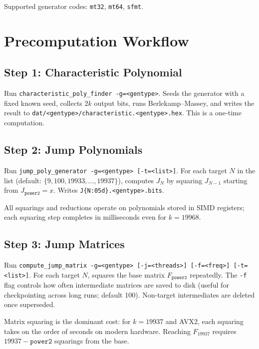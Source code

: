 \documentclass{article}
\begin{document}
Supported generator codes: \texttt{mt32}, \texttt{mt64}, \texttt{sfmt}.

\section{Precomputation Workflow}
\label{sec:workflow}

\subsection{Step 1: Characteristic Polynomial}

Run \texttt{characteristic\_poly\_finder -g=<gentype>}.  Seeds the generator with a fixed
known seed, collects $2k$ output bits, runs Berlekamp--Massey, and writes the result to
\texttt{dat/<gentype>/characteristic.<gentype>.hex}.  This is a one-time computation.

\subsection{Step 2: Jump Polynomials}

Run \texttt{jump\_poly\_generator -g=<gentype> [-t=<list>]}.  For each target $N$ in the
list (default: $\{9, 100, 19933, \ldots, 19937\}$), computes $J_N$ by squaring $J_{N-1}$
starting from $J_{\mathtt{power2}} = x$.  Writes \texttt{J\{N:05d\}.<gentype>.bits}.

All squarings and reductions operate on polynomials stored in SIMD registers; each
squaring step completes in milliseconds even for $k = 19968$.

\subsection{Step 3: Jump Matrices}

Run \texttt{compute\_jump\_matrix -g=<gentype> [-j=<threads>] [-f=<freq>] [-t=<list>]}.
For each target $N$, squares the base matrix $F_{\mathtt{power2}}$ repeatedly.  The
\texttt{-f} flag controls how often intermediate matrices are saved to disk (useful for
checkpointing across long runs; default 100).  Non-target intermediates are deleted once
superseded.

Matrix squaring is the dominant cost: for $k = 19937$ and AVX2, each squaring takes on the
order of seconds on modern hardware.  Reaching $F_{19937}$ requires $19937 -
\mathtt{power2}$ squarings from the base.
\end{document}
